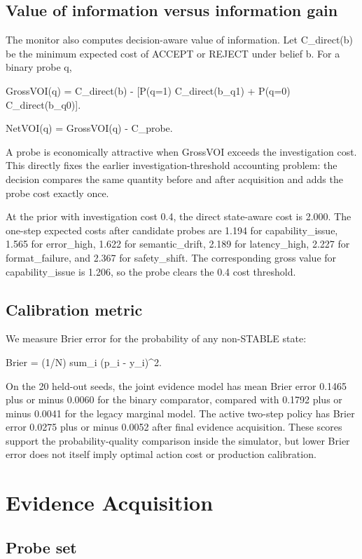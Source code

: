 \documentclass{article}
\begin{document}
\subsection{Value of information versus information gain}

The monitor also computes decision-aware value of information. Let C\_direct(b) be the minimum expected cost of ACCEPT or REJECT under belief b. For a binary probe q,

GrossVOI(q) = C\_direct(b) - {[}P(q=1) C\_direct(b\_q1) + P(q=0) C\_direct(b\_q0){]}.

NetVOI(q) = GrossVOI(q) - C\_probe.

A probe is economically attractive when GrossVOI exceeds the investigation cost. This directly fixes the earlier investigation-threshold accounting problem: the decision compares the same quantity before and after acquisition and adds the probe cost exactly once.

At the prior with investigation cost 0.4, the direct state-aware cost is 2.000. The one-step expected costs after candidate probes are 1.194 for capability\_issue, 1.565 for error\_high, 1.622 for semantic\_drift, 2.189 for latency\_high, 2.227 for format\_failure, and 2.367 for safety\_shift. The corresponding gross value for capability\_issue is 1.206, so the probe clears the 0.4 cost threshold.

\subsection{Calibration metric}

We measure Brier error for the probability of any non-STABLE state:

Brier = (1/N) sum\_i (p\_i - y\_i)\^{}2.

On the 20 held-out seeds, the joint evidence model has mean Brier error 0.1465 plus or minus 0.0060 for the binary comparator, compared with 0.1792 plus or minus 0.0041 for the legacy marginal model. The active two-step policy has Brier error 0.0275 plus or minus 0.0052 after final evidence acquisition. These scores support the probability-quality comparison inside the simulator, but lower Brier error does not itself imply optimal action cost or production calibration.

\section{Evidence Acquisition}

\subsection{Probe set}
\end{document}
